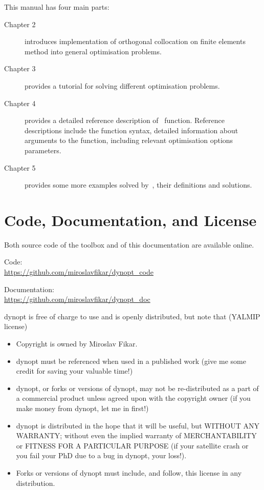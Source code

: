 This manual has four main parts:
\begin{description}
\item[Chapter 2] introduces implementation of orthogonal collocation
  on finite elements method into general optimisation problems.
\item[Chapter 3] provides a tutorial for solving different
  optimisation problems.
\item[Chapter 4] provides a detailed reference description
  of~ function. Reference descriptions include the
  function syntax, detailed information about arguments to the
  function, including relevant optimisation options parameters.
\item[Chapter 5] provides some more examples solved by~,
  their definitions and solutions.
\end{description}

\section{Code, Documentation, and License}
Both source code of the toolbox and of this documentation
are available online.

Code:\\
\url{https://github.com/miroslavfikar/dynopt_code}

Documentation:\\
\url{https://github.com/miroslavfikar/dynopt_doc}

\medskip
\noindent
dynopt is free of charge to use and is openly distributed, but note
that (YALMIP license)
\begin{itemize}
\item Copyright is owned by Miroslav Fikar.
\item dynopt must be referenced when used in a published work (give me
  some credit for saving your valuable time!)
\item dynopt, or forks or versions of dynopt, may not be
  re-distributed as a part of a commercial product unless agreed upon
  with the copyright owner (if you make money from dynopt, let me in
  first!)
\item dynopt is distributed in the hope that it will be useful, but
  WITHOUT ANY WARRANTY; without even the implied warranty of
  MERCHANTABILITY or FITNESS FOR A PARTICULAR PURPOSE (if your
  satellite crash or you fail your PhD due to a bug in dynopt, your
  loss!).
\item Forks or versions of dynopt must include, and follow, this
  license in any distribution.
\end{itemize}
 
